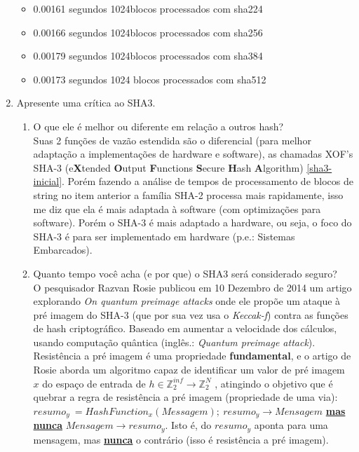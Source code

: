 \documentclass[12pt, a4paper]{article}
\begin{document}
\begin{enumerate}
  \begin{itemize}
    \item
    0.00161 segundos
    1024blocos processados com sha224

    \item
    0.00166 segundos
    1024blocos processados com sha256

    \item
    0.00179 segundos
    1024blocos processados com sha384

    \item
    0.00173 segundos
    1024 blocos processados com sha512
  \end{itemize}

\item Apresente uma crítica ao SHA3.\\

  \begin{enumerate}
    \item O que ele é melhor ou diferente em relação a outros hash?\\

    Suas 2 funções de vazão estendida são o diferencial (para melhor adaptação a
    implementações de hardware e software), as chamadas XOF's SHA-3
    (e\textbf{X}tended \textbf{O}utput \textbf{F}unctions \textbf{S}ecure
    \textbf{H}ash \textbf{A}lgorithm) \ref{sha3-inicial}. Porém fazendo a
    análise de tempos de processamento de blocos de string no item anterior a
    família SHA-2 processa mais rapidamente, isso me diz que ela é mais adaptada
    à software (com optimizações para software). Porém o SHA-3 é mais adaptado a
    hardware, ou seja, o foco do SHA-3 é para ser implementado em hardware
    (p.e.: Sistemas Embarcados).\\

    \item Quanto tempo você acha (e por que) o SHA3 será considerado seguro?\\

    O pesquisador Razvan Rosie publicou em 10 Dezembro de 2014 um artigo
    explorando \textit{On quantum preimage attacks} onde ele propõe um ataque à
    pré imagem do SHA-3 (que por sua vez usa o \textit{Keccak-f}) contra as
    funções de hash criptográfico. Baseado em aumentar a velocidade dos
    cálculos, usando computação quântica (inglês.: \textit{Quantum preimage
    attack}). Resistência a pré imagem é uma propriedade \textbf{fundamental}, e
    o artigo de Rosie aborda um algoritmo capaz de identificar um valor de pré
    imagem $x$ do espaço de entrada de $h \in \mathbb{Z}_{2}^{inf} \rightarrow
    \mathbb{Z}_{2}^{N}$ \cite{rosie14}, atingindo o objetivo que é quebrar a
    regra de resistência a pré imagem (propriedade de uma via): $resumo_y\ =
    HashFunction_x(Messagem);\ resumo_y \rightarrow Mensagem$
    \underline{\color{red} \textbf{mas}} \underline{\color{red} \textbf{nunca}}
    $Mensagem \rightarrow resumo_y$. Isto é, do $resumo_y$ aponta para uma
    mensagem, mas \textbf{\underline{nunca}} o contrário (isso é resistência a
    pré imagem).\\


\end{enumerate}
\end{enumerate}
\end{document}
